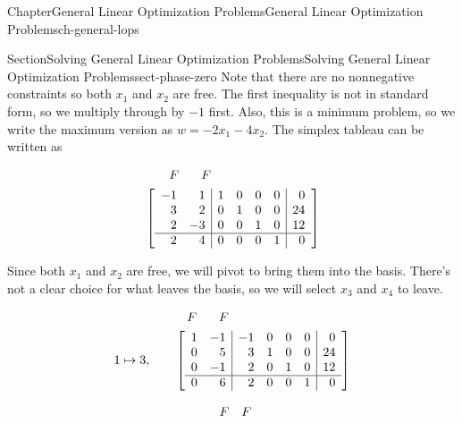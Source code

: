 \documentclass[oneside,10pt,]{book}
\numberwithin{equation}{section}
\newcommand{\amp}{&}
\begin{document}
\begin{chapterptx}{Chapter}{General Linear Optimization Problems}{}{General Linear Optimization Problems}{}{}{ch-general-lops}
\begin{sectionptx}{Section}{Solving General Linear Optimization Problems}{}{Solving General Linear Optimization Problems}{}{}{sect-phase-zero}
Note that there are no nonnegative constraints so both \(x_1\) and \(x_2\) are free. The first inequality is not in standard form, so we multiply through by \(-1\) first. Also, this is a minimum problem, so we write the maximum version as \(w = -2x_1-4x_2\). The simplex tableau can be written as%
\par
%
\begin{align*}
\amp\begin{array}{rrrrrr}\phantom{111} {\small F} \amp \phantom{-}{\small F} \end{array}\\
\amp \left[\begin{array}{rr|rrrr|r} -1 \amp 1 \amp 1 \amp 0 \amp 0 \amp 0 \amp 0\\ 3 \amp 2 \amp 0 \amp 1 \amp 0 \amp 0 \amp 24\\ 2 \amp -3 \amp 0 \amp 0 \amp 1 \amp 0 \amp 12\\ \hline 2 \amp 4 \amp 0 \amp 0 \amp 0 \amp 1 \amp 0\\ \end{array} \right]
\end{align*}
%
\par
Since both \(x_1\) and \(x_2\) are free, we will pivot to bring them into the basis. There's not a clear choice for what leaves the basis, so we will select \(x_3\) and \(x_4\) to leave.%
\par
%
\begin{align*}
\amp\begin{array}{rrrrrr}\phantom{1} {\small F} \amp \phantom{-}{\small F} \end{array}\\
1 \mapsto 3, \qquad \amp \left[\begin{array}{rr|rrrr|r} 1 \amp -1 \amp -1 \amp 0 \amp 0 \amp 0 \amp 0\\ 0 \amp 5 \amp 3 \amp 1 \amp 0 \amp 0 \amp 24\\ 0 \amp -1 \amp 2 \amp 0 \amp 1 \amp 0 \amp 12\\ \hline 0 \amp 6 \amp 2 \amp 0 \amp 0 \amp 1 \amp 0\\ \end{array} \right]
\end{align*}
%
\par
%
\begin{align*}
\amp\begin{array}{rrrrrr}\phantom{1} {\small F} \amp {\small F} \end{array}\\

\end{align*}
\end{sectionptx}
\end{chapterptx}
\end{document}
